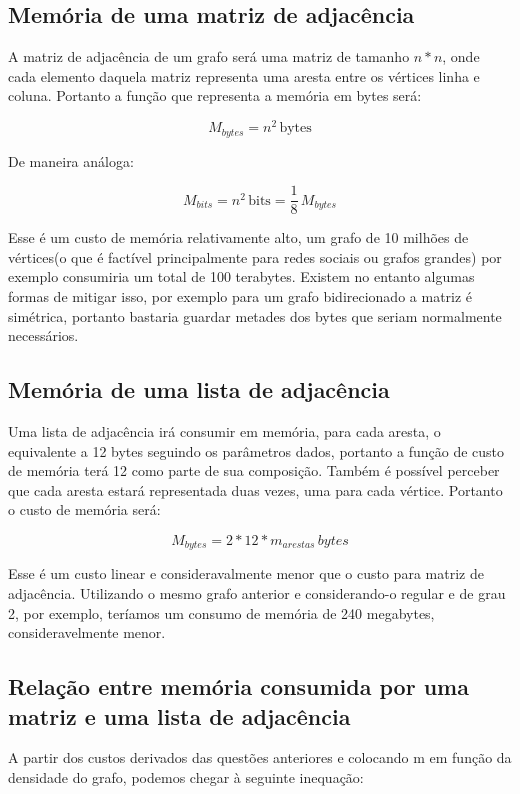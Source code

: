 \documentclass{article}
\begin{document}
\subsection{Memória de uma matriz de adjacência}

A matriz de adjacência de um grafo será uma matriz de tamanho ${n * n}$, onde cada elemento daquela matriz representa uma aresta entre os vértices linha e coluna. Portanto a função que representa a memória em bytes será:

\[M_{bytes} = n^2\,\textrm{bytes}\]

De maneira análoga:

\[M_{bits} = n^2\,\textrm{bits} = \frac{1}{8}\,M_{bytes}\]

Esse é um custo de memória relativamente alto, um grafo de 10 milhões de vértices(o que é factível principalmente para redes sociais ou grafos grandes) por exemplo consumiria um total de 100 terabytes. Existem no entanto algumas formas de mitigar isso, por exemplo para um grafo bidirecionado a matriz é simétrica, portanto bastaria guardar metades dos bytes que seriam normalmente necessários.

\subsection{Memória de uma lista de adjacência}

Uma lista de adjacência irá consumir em memória, para cada aresta, o equivalente a 12 bytes seguindo os parâmetros dados, portanto a função de custo de memória terá 12 como parte de sua composição. Também é possível perceber que cada aresta estará representada duas vezes, uma para cada vértice. Portanto o custo de memória será:

\[M_{bytes} = 2 * 12 * m_{arestas}\, bytes\]

Esse é um custo linear e consideravalmente menor que o custo para matriz de adjacência. Utilizando o mesmo grafo anterior e considerando-o regular e de grau 2, por exemplo, teríamos um consumo de memória de 240 megabytes, consideravelmente menor.

\subsection{Relação entre memória consumida por uma matriz e uma lista de adjacência}

A partir dos custos derivados das questões anteriores e colocando m em função da densidade do grafo, podemos chegar à seguinte inequação:
\end{document}
